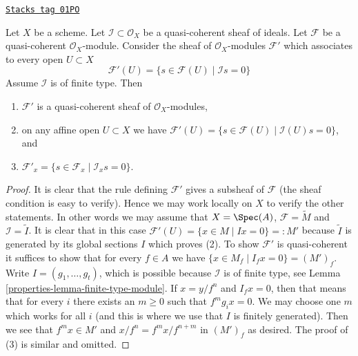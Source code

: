 \begin{lemma}
\label{properties-lemma-sections-annihilated-by-ideal}
\href{https://stacks.math.columbia.edu/tag/01PO}{\texttt{Stacks tag 01PO}}

Let $X$ be a scheme.
Let $\mathcal{I} \subset \mathcal{O}_X$ be a quasi-coherent sheaf of ideals.
Let $\mathcal{F}$ be a quasi-coherent $\mathcal{O}_X$-module.
Consider the sheaf of $\mathcal{O}_X$-modules $\mathcal{F}'$
which associates to every open $U \subset X$
$$
\mathcal{F}'(U)
=
\{s \in \mathcal{F}(U) \mid
\mathcal{I}s = 0\}
$$
Assume $\mathcal{I}$ is of finite type. Then
\begin{enumerate}
\item $\mathcal{F}'$ is a quasi-coherent sheaf of $\mathcal{O}_X$-modules,
\item on any affine open $U \subset X$ we have
$\mathcal{F}'(U) = \{s \in \mathcal{F}(U) \mid \mathcal{I}(U)s = 0\}$, and
\item $\mathcal{F}'_x = \{s \in \mathcal{F}_x \mid \mathcal{I}_x s = 0\}$.
\end{enumerate}
\end{lemma}

\begin{proof}

It is clear that the rule defining $\mathcal{F}'$ gives a subsheaf
of $\mathcal{F}$ (the sheaf condition is easy to verify). Hence we
may work locally on $X$ to verify the other statements. In other words
we may assume that $X = \Spec(A)$, $\mathcal{F} = \widetilde{M}$
and $\mathcal{I} = \widetilde{I}$. It is clear that in this case
$\mathcal{F}'(U) = \{x \in M \mid Ix = 0\} =: M'$ because $\widetilde{I}$
is generated by its global sections $I$ which proves (2).
To show $\mathcal{F}'$ is quasi-coherent it suffices to show that
for every $f \in A$ we have
$\{x \in M_f \mid I_f x = 0\} = (M')_f$.
Write $I = (g_1, \ldots, g_t)$, which is possible because $\mathcal{I}$
is of finite type, see Lemma \ref{properties-lemma-finite-type-module}.
If $x = y/f^n$ and $I_fx = 0$, then that means that for every $i$
there exists an $m \geq 0$ such that $f^mg_ix = 0$.
We may choose one $m$ which works for all $i$ (and this is where we
use that $I$ is finitely generated). Then we see that $f^mx \in M'$
and $x/f^n = f^mx/f^{n + m}$ in $(M')_f$ as desired.
The proof of (3) is similar and omitted.
\end{proof}

